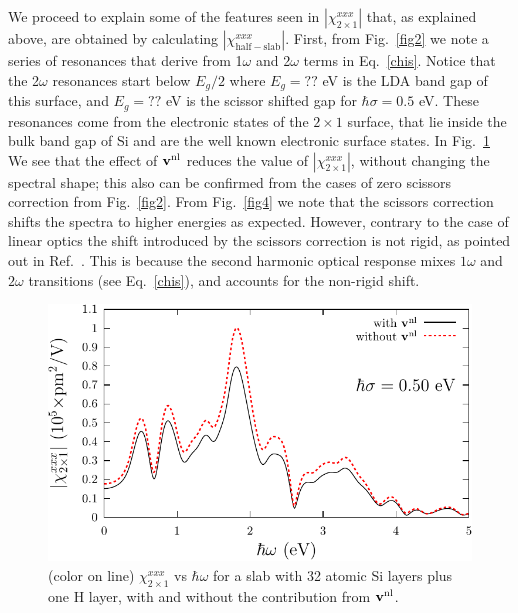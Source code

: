 \documentclass[floatfix,prb,aps,superscriptaddress,11pt,preprint,letterpaper]{revtex4}
\def\chon{black}
\begin{document}
We proceed to explain 
some of the features seen in $|\chi^{xxx}_{2\times 1}|$ that, as
explained above, are obtained 
by calculating $|\chi^{xxx}_{\mathrm{half-slab}}|$.
{\color{\chon} First,} from Fig.~\ref{fig2} we note a series of resonances 
that {\color{\chon} derive from} 1$\omega$ and 2$\omega$ terms in
Eq.~\eqref{chis}. 
Notice that the 
2$\omega$ resonances start below $E_g/2$ where $E_g=??$ eV is the LDA
band gap of this surface, and $E_g=??$ eV is the scissor shifted gap for
$\hbar\sigma=0.5$ eV.
These resonances
{\color{\chon} come} from the electronic states of the 
$2\times 1$ surface, that lie inside the bulk band gap of Si and are the 
well known electronic surface states.
In Fig.~\ref{fig3}
We see that the effect of $\mathbf{v}^{\mathrm{nl}}$ reduces the value of   
$|\chi^{xxx}_{2\times 1}|$,
without changing the 
{\color{\chon} spectral shape}; this also can be confirmed from
the cases of zero scissors correction from Fig.~\ref{fig2}.
%
From Fig.~\ref{fig4}
{\color{\chon} we note that the scissors correction 
shifts the spectra to higher energies as expected. However, contrary 
to the case of linear optics\cite{cabellosPRB09} the shift introduced
by the scissors correction is not 
rigid, as pointed out in Ref.~.
 This is because the second harmonic optical response mixes 
$1\omega$ and $2\omega$ transitions (see Eq.~\eqref{chis}), and accounts 
for the non-rigid shift.}
\begin{figure}
\centering 
\includegraphics[scale=.8]{plots/fig3}
\caption{(color on line) 
$\chi^{xxx}_{2\times 1}$
vs $\hbar\omega$ for a slab {\color{\chon} with} 32 
atomic Si layers plus one {\color{\chon} H layer}, 
with and without the contribution from $\mathbf{v}^{\mathrm{nl}}$.
\label{fig3}} 
\end{figure}
\end{document}
